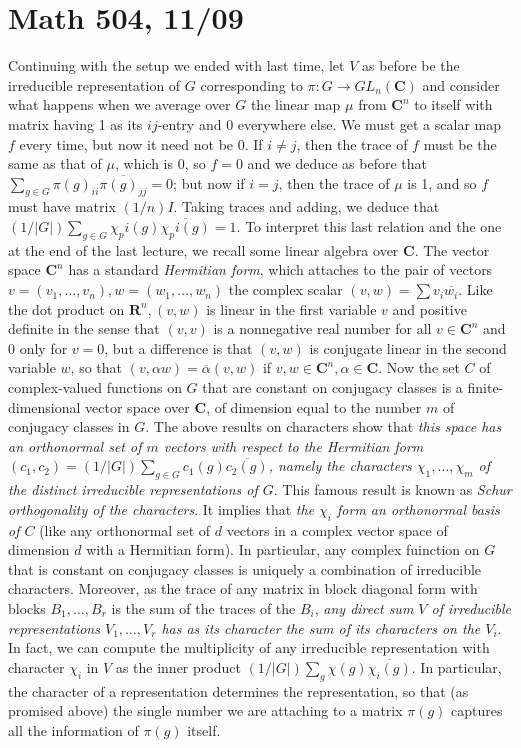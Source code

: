 \documentclass[10pt]{article}
\begin{document}
\section*{Math 504, 11/09}

Continuing with the setup we ended with last time, let $V$ as before be
the irreducible representation of $G$ corresponding to $\pi:G\rightarrow
GL_n(\mathbf C)$ and consider what happens when we average over $G$ the
linear map $\mu$ from $\mathbf C^n$ to itself with matrix having 1 as
its $ij$-entry and 0 everywhere else. We must get a scalar map $f$ every
time, but now it need not be 0. If $i\ne j$, then the trace of $f$ must
be the same as that of $\mu$, which is 0, so $f=0$ and we deduce as
before that $\sum_{g\in G} \pi(g)_{ii} \overline{\pi(g)_{jj}} = 0$; but
now if $i=j$, then the trace of $\mu$ is 1, and so $f$ must have matrix
$(1/n)I$. Taking traces and adding, we deduce that $(1/ | G |)\sum_{g\in
  G} \chi_pi(g)\overline{\chi_pi(g)} = 1$. To interpret this last
relation and the one at the end of the last lecture, we recall some
linear algebra over $\mathbf C$. The vector space $\mathbf C^n$ has a
standard {\sl Hermitian form}, which attaches to the pair of vectors $v
= (v_1,\ldots,v_n), w = (w_1,\ldots,w_n)$ the complex scalar $(v,w) =
\sum v_i\overline{w_i}$. Like the dot product on $\mathbf R^n, (v,w)$ is
linear in the first variable $v$ and positive definite in the sense that
$(v,v)$ is a nonnegative real number for all $v\in\mathbf C^n$ and 0
only for $v=0$, but a difference is that $(v,w)$ is conjugate linear in
the second variable $w$, so that $(v,\alpha w) = \overline{\alpha}(v,w)$
if $v,w\in\mathbf C^n,\alpha\in\mathbf C$. Now the set $C$ of
complex-valued functions on $G$ that are constant on conjugacy classes
is a finite-dimensional vector space over $\mathbf C$, of dimension
equal to the number $m$ of conjugacy classes in $G$. The above results
on characters show that {\sl this space has an orthonormal set of $m$
  vectors with respect to the Hermitian form $(c_1,c_2) = (1/ |G|
  )\sum_{g\in G} c_1(g)\overline{c_2(g)}$, namely the characters
  $\chi_1,\ldots,\chi_m$ of the distinct irreducible representations of
  $G$}. This famous result is known as {\sl Schur orthogonality of the
  characters}. It implies that {\sl the $\chi_i$ form an orthonormal
  basis of $C$} (like any orthonormal set of $d$ vectors in a complex
vector space of dimension $d$ with a Hermitian form). In particular, any
complex fuinction on $G$ that is constant on conjugacy classes is
uniquely a combination of irreducible characters. Moreover, as the trace
of any matrix in block diagonal form with blocks $B_1,\ldots,B_r$ is the
sum of the traces of the $B_i$, {\sl any direct sum $V$ of irreducible
  representations $V_1,\ldots,V_r$ has as its character the sum of its
  characters on the $V_i$}. In fact, we can compute the multiplicity of
any irreducible representation with character $\chi_i$ in $V$ as the
inner product $(1/|G|) \sum_g \chi(g)\overline{\chi_i(g)}$. In
particular, the character of a representation determines the
representation, so that (as promised above) the single number we are
attaching to a matrix $\pi(g)$ captures all the information of $\pi(g)$
itself.
\end{document}
